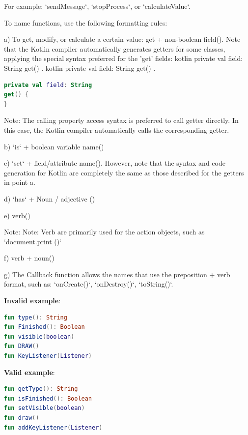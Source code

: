 For example: `sendMessage`, `stopProcess`, or `calculateValue`.

To name functions, use the following formatting rules:



a) To get, modify, or calculate a certain value: get + non-boolean field(). Note that the Kotlin compiler automatically generates getters for some classes, applying the special syntax preferred for the 'get' fields: kotlin private val field: String get() { }. kotlin private val field: String get() { }.

\begin{lstlisting}[language=Kotlin]
private val field: String
get() {
}
\end{lstlisting}
Note: The calling property access syntax is preferred to call getter directly. In this case, the Kotlin compiler automatically calls the corresponding getter.



b) `is` + boolean variable name()



c) `set` + field/attribute name(). However, note that the syntax and code generation for Kotlin are completely the same as those described for the getters in point a.



d) `has` + Noun / adjective ()



e) verb()

Note: Note: Verb are primarily used for the action objects, such as `document.print ()`



f) verb + noun() 



g) The Callback function allows the names that use the preposition + verb format, such as: `onCreate()`, `onDestroy()`, `toString()`.



\textbf{Invalid example}: 



\begin{lstlisting}[language=Kotlin]
fun type(): String
fun Finished(): Boolean
fun visible(boolean)
fun DRAW()
fun KeyListener(Listener)
\end{lstlisting}


\textbf{Valid example}: 



\begin{lstlisting}[language=Kotlin]
fun getType(): String
fun isFinished(): Boolean
fun setVisible(boolean)
fun draw()
fun addKeyListener(Listener)
\end{lstlisting}


